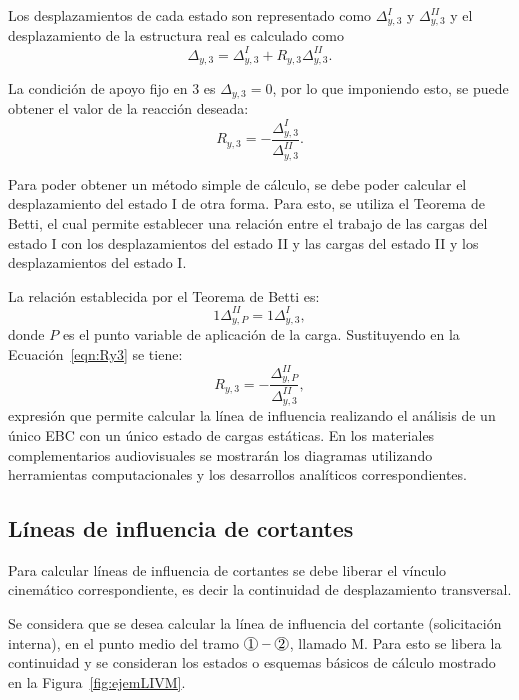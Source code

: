 Los desplazamientos de cada estado son representado como $\Delta^I_{y,3}$ y $\Delta^{II}_{y,3}$ y el desplazamiento de la estructura real es calculado como
\begin{equation}
  \Delta_{y,3} = \Delta_{y,3}^I + R_{y,3} \Delta_{y,3}^{II}.
\end{equation}

La condición de apoyo fijo en 3 es $\Delta_{y,3}=0$, por lo que imponiendo esto, se puede obtener el valor de la reacción deseada:
%
\begin{equation}\label{eqn:Ry3}
  R_{y,3} = - \frac{\Delta_{y,3}^I}{ \Delta_{y,3}^{II}}.
\end{equation}

Para poder obtener un método simple de cálculo, se debe poder calcular el desplazamiento del estado I de otra forma. Para esto, se utiliza el Teorema de Betti, el cual permite establecer una relación entre el trabajo de las cargas del estado I con los desplazamientos del estado II y las cargas del estado II y los desplazamientos del estado I.

La relación establecida por el Teorema de Betti es:
%
\begin{equation}
1 \Delta_{y,P}^{II} = 1 \Delta_{y,3}^{I},
\end{equation}
donde $P$ es el punto variable de aplicación de la carga. %
%
Sustituyendo en la Ecuación~\eqref{eqn:Ry3} se tiene:
%
\begin{equation}
\boxed{
R_{y,3} = - \frac{\Delta_{y,P}^{II}}{ \Delta_{y,3}^{II}},
}
\end{equation}
%
expresión que permite calcular la línea de influencia realizando el análisis de un único EBC con un único estado de cargas estáticas.
%
En los materiales complementarios audiovisuales se mostrarán los diagramas utilizando herramientas computacionales y los desarrollos analíticos correspondientes.


\subsection{Líneas de influencia de cortantes}

Para calcular líneas de influencia de cortantes se debe liberar el vínculo cinemático correspondiente, es decir la continuidad de desplazamiento transversal.

Se considera que se desea calcular la línea de influencia del cortante (solicitación interna), en el punto medio del tramo $\circled{1}-\circled{2}$, llamado M. Para esto se libera la continuidad y se consideran los estados o esquemas básicos de cálculo mostrado en la Figura~\ref{fig:ejemLIVM}. 

